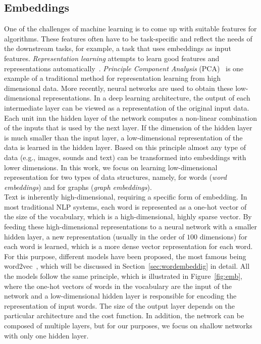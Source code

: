 \subsection{Embeddings}\label{subsec:embeddings}
One of the challenges of machine learning is to come up with suitable features for algorithms. These features often have to be task-specific and reflect the needs of the downstream tasks, for example, a task that uses embeddings as input features. \emph{Representation learning} attempts to learn good features and representations automatically~. \emph{Principle Component Analysis} (PCA)~ is one example of a traditional method for representation learning from high dimensional data. More recently, neural networks are used to obtain these low-dimensional representations. In a deep learning architecture, the output of each intermediate layer can be viewed as a representation of the original input data. Each unit inn the hidden layer of the network computes a non-linear combination of the inputs that is used by the next layer.  If the dimension of the hidden layer is much smaller than the input layer, a low-dimensional representation of the data is learned in the hidden layer. Based on this principle almost any type of data (e.g., images, sounds and text) can be transformed into embeddings with lower dimensions. In this work, we focus on learning low-dimensional representation for two types of data structures, namely, for words (\emph{word embeddings}) and for graphs (\emph{graph embeddings}). \\
Text is inherently high-dimensional, requiring a specific form of embedding.
In most traditional NLP systems, each word is represented as a one-hot vector of the size of the vocabulary, which is a high-dimensional, highly sparse vector. 
By feeding these high-dimensional representations to a neural network with a smaller hidden layer, a new representation (usually in the order of $100$ dimensions) for each word is learned, which is a more dense vector representation for each word. For this purpose, different models have been proposed, the most famous being word2vec~, which will be discussed in Section~\ref{sec:wordembeddig} in detail. All the models follow the same principle, which is illustrated in Figure~\ref{fig:emb}, where the one-hot vectors of words in the vocabulary are the input of the network and a low-dimensional hidden layer is responsible for encoding the representation of input words.  The size of the output layer depends on the particular architecture and the cost function. In addition, the network can be composed of multiple layers, but for our purposes, we focus on shallow networks with only one hidden layer. \\
